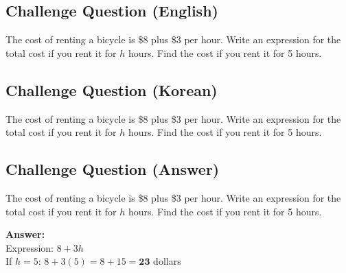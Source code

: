 \cleardoublepage
\subsection*{Challenge Question (English)}
The cost of renting a bicycle is \$8 plus \$3 per hour. Write an expression for the total cost if you rent it for $h$ hours. Find the cost if you rent it for 5 hours.


\newpage
\subsection*{Challenge Question (Korean)}
The cost of renting a bicycle is \$8 plus \$3 per hour. Write an expression for the total cost if you rent it for $h$ hours. Find the cost if you rent it for 5 hours.


\newpage
\subsection*{Challenge Question (Answer)}
The cost of renting a bicycle is \$8 plus \$3 per hour. Write an expression for the total cost if you rent it for $h$ hours. Find the cost if you rent it for 5 hours.

\textbf{Answer:}\\
Expression: $8 + 3h$\\
If $h = 5$: $8 + 3(5) = 8 + 15 = \mathbf{23}$ dollars
